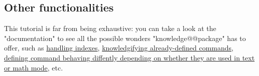 \documentclass{article}
\begin{document}
\subsection{Other functionalities}

This tutorial is far from being exhaustive: you can take a look at
the "documentation" to see all the possible wonders "knowledge@@package" has
to offer, such as \href{https://mirror.ibcp.fr/pub/CTAN/macros/latex/contrib/knowledge/knowledge.pdf#subsubsection.3.8.3}{handling indexes}, \href{https://mirror.ibcp.fr/pub/CTAN/macros/latex/contrib/knowledge/knowledge.pdf#subsubsection.3.9.3}{knowledgifying already-defined commands}, \href{https://mirror.ibcp.fr/pub/CTAN/macros/latex/contrib/knowledge/knowledge.pdf#subsubsection.3.9.3}{defining command behaving diffently depending on whether they are used in text or math mode}, etc. 
\end{document}

